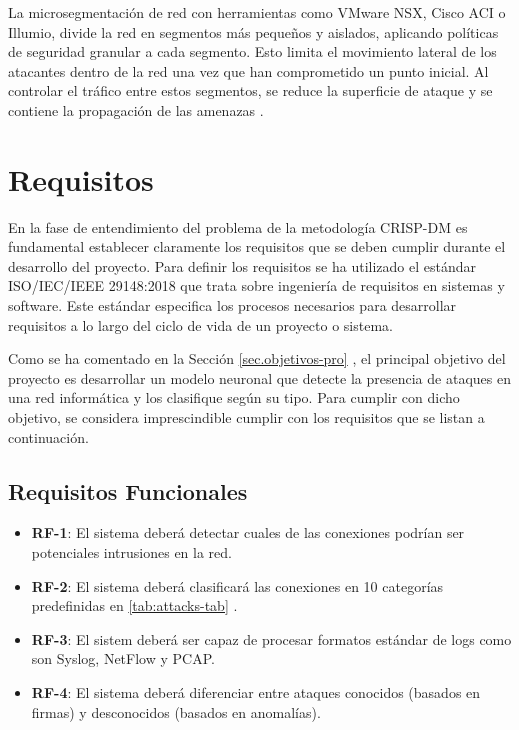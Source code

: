 La microsegmentación de red con herramientas como VMware NSX, Cisco ACI o Illumio, divide la red en segmentos más pequeños y aislados, aplicando políticas de seguridad granular a cada segmento. Esto limita el movimiento lateral de los atacantes dentro de la red una vez que han comprometido un punto inicial. Al controlar el tráfico entre estos segmentos, se reduce la superficie de ataque y se contiene la propagación de las amenazas \cite{paloaltonetworks_microsegmentation}.

\section{Requisitos}  \label{sec.requisitos} 
En la fase de entendimiento del problema de la metodología CRISP-DM es fundamental establecer claramente los requisitos que se deben cumplir durante el desarrollo del proyecto. Para definir los requisitos se ha utilizado el estándar ISO/IEC/IEEE 29148:2018 \cite{ISO29148} que trata sobre ingeniería de requisitos en sistemas y software. Este estándar especifica los procesos necesarios para desarrollar requisitos a lo largo del ciclo de vida de un proyecto o sistema.

Como se ha comentado en la Sección \ref{sec.objetivos-pro} , el principal objetivo del proyecto es desarrollar un modelo neuronal que detecte la presencia de ataques en una red informática y los clasifique según su tipo. Para cumplir con dicho objetivo, se considera imprescindible cumplir con los requisitos que se listan a continuación.

\subsection{Requisitos Funcionales}   \label{sec.req-funcionales}

\begin{itemize}  
    \item \textbf{RF-1}: El sistema deberá detectar cuales de las conexiones podrían ser potenciales intrusiones en la red.
    \item \textbf{RF-2}: El sistema deberá clasificará las conexiones en 10 categorías predefinidas en \ref{tab:attacks-tab} .  
	\item \textbf{RF-3}: El sistem deberá ser capaz de procesar formatos estándar de logs como son Syslog, NetFlow y PCAP.
	\item \textbf{RF-4}: El sistema deberá diferenciar entre ataques conocidos (basados en firmas) y desconocidos (basados en anomalías).
	
\end{itemize}  


